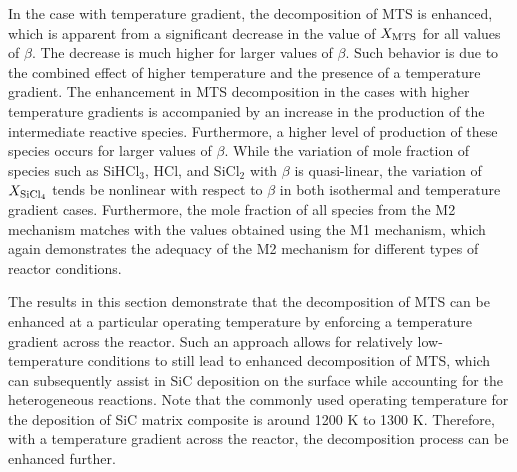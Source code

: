 \documentclass[final, letterpaper, square, comma, numbers, sort&compress]{elsarticle}
\begin{document}
In the case with temperature gradient, the decomposition of MTS is enhanced, which is apparent from a significant decrease in the value of $X_{\rm MTS}$ for all values of $\beta$. The decrease is much higher for larger values of $\beta$. Such behavior is due to the combined effect of higher temperature and the presence of a temperature gradient. The enhancement in MTS decomposition in the cases with higher temperature gradients is accompanied by an increase in the production of the intermediate reactive species. Furthermore, a higher level of production of these species occurs for larger values of $\beta$. While the variation of mole fraction of species such as SiHCl$_3$, HCl, and SiCl$_2$ with $\beta$ is quasi-linear, the variation of $X_{\rm SiCl_4}$ tends be nonlinear with respect to $\beta$ in both isothermal and temperature gradient cases. Furthermore, the mole fraction of all species from the M2 mechanism matches with the values obtained using the M1 mechanism, which again demonstrates the adequacy of the M2 mechanism for different types of reactor conditions.

The results in this section demonstrate that the decomposition of MTS can be enhanced at a particular operating temperature by enforcing a temperature gradient across the reactor. Such an approach allows for relatively low-temperature conditions to still lead to enhanced decomposition of MTS, which can subsequently assist in SiC deposition on the surface while accounting for the heterogeneous reactions. Note that the commonly used operating temperature for the deposition of SiC matrix composite is around 1200 K to 1300 K. Therefore, with a temperature gradient across the reactor, the decomposition process can be enhanced further.
\end{document}
